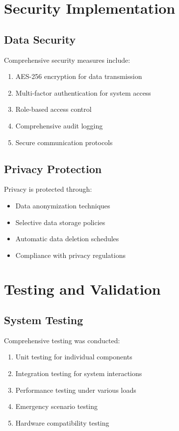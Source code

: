 \section{Security Implementation}

\subsection{Data Security}

Comprehensive security measures include:

\begin{enumerate}
    \item AES-256 encryption for data transmission
    \item Multi-factor authentication for system access
    \item Role-based access control
    \item Comprehensive audit logging
    \item Secure communication protocols
\end{enumerate}

\subsection{Privacy Protection}

Privacy is protected through:

\begin{itemize}
    \item Data anonymization techniques
    \item Selective data storage policies
    \item Automatic data deletion schedules
    \item Compliance with privacy regulations
\end{itemize}

\section{Testing and Validation}

\subsection{System Testing}

Comprehensive testing was conducted:

\begin{enumerate}
    \item Unit testing for individual components
    \item Integration testing for system interactions
    \item Performance testing under various loads
    \item Emergency scenario testing
    \item Hardware compatibility testing
\end{enumerate}

